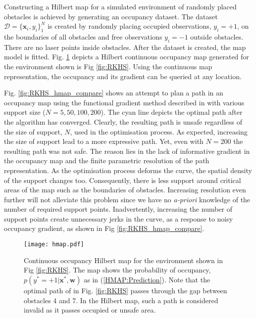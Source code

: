 \documentclass[letterpaper, 10 pt, conference]{ieeeconf}  %
\begin{document}
Constructing a Hilbert map for a simulated environment of randomly placed obstacles is achieved by generating an occupancy dataset. The dataset  $\mathcal{D}=\{\boldsymbol{x}_i,y_i\}^N_1$ is created by randomly placing occupied observations, $y_i = +1$,  on the boundaries of all obstacles and free observations $y_i = -1$ outside obstacles. There are no laser points inside obstacles. After the dataset is created, the map model is fitted. Fig. \ref{fig:hmap} depicts a Hilbert continuous occupancy map generated for the environment shown is Fig \ref{fig:RKHS}.
Using the continuous map representation, the occupancy and its gradient can be queried at any location. 

Fig. \ref{fig:RKHS_hmap_compare} shows an attempt to plan a path in an occupancy map using the functional gradient method described in \cite{Marinho2016} with various support size ($N=5,50,100,200$). The cyan line depicts the optimal path after the algorithm has converged. Clearly, the resulting path is unsafe regardless of the size of support, $N$, used in the optimisation process. As expected, increasing the size of support lead to a more expressive path. Yet, even with $N=200$ the resulting path was not safe. The reason lies in the lack of informative gradient in the occupancy map and the finite parametric resolution of the path representation. As the optimisation process deforms the curve, the spatial density of the support changes too.  Consequently, there is less support around critical areas of the map such as the boundaries of obstacles. Increasing resolution even further will not alleviate this problem since we have no \textit{a-priori} knowledge of the number of required support points. Inadvertently, increasing the number of support points create unnecessary jerks in the curve, as a response to noisy occupancy gradient, as shown in Fig \ref{fig:RKHS_hmap_compare}.
\begin{figure}[thpb]
	
	\centering
	
	\texttt{[image: hmap.pdf]}
	
	\caption{Continuous occupancy Hilbert map for the environment shown in Fig \ref{fig:RKHS}. The map shows the probability of occupancy, $p(y^* = +1|\boldsymbol{x}^*,\boldsymbol{w})$ as in (\ref{HMAP:Prediction}). Note that the optimal path of in Fig. \ref{fig:RKHS} passes through the gap between obstacles 4 and 7. In the Hilbert map, such a path is considered invalid as it passes occupied or unsafe area.}
	\label{fig:hmap}
    \hspace{-5mm}
\end{figure}
\end{document}
